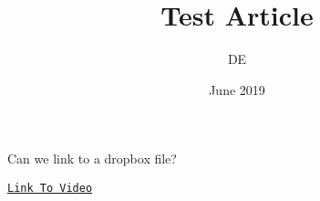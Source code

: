 \documentclass[12pt]{article}
\title{Test Article}
\author{DE}
\date{June 2019}
\providecommand{\includevideo}{}
\renewcommand{\includevideo}[2][1]{\href{#2}{\small\tt Link To Video}}
\begin{document}
\label{doc:testdoc}
\maketitle
\tableofcontents















Can we link to a dropbox file?

\includevideo{https://www.dropbox.com/s/p4le3wrdn9ti6wf/bluebird.jpeg}



\end{document}
